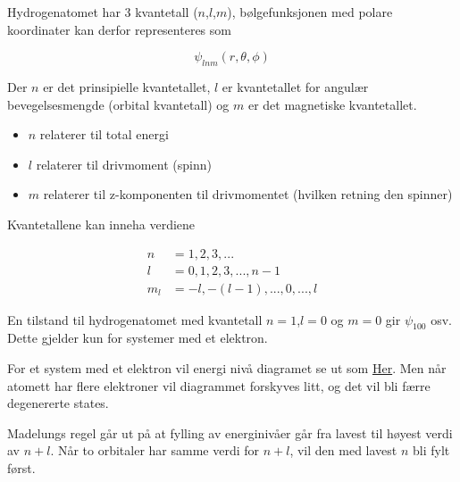 Hydrogenatomet har 3 kvantetall ($n$,$l$,$m$), bølgefunksjonen med polare koordinater kan derfor representeres som

\begin{equation}
    \psi_{lnm}(r,\theta,\phi)
\end{equation}

Der $n$ er det prinsipielle kvantetallet, $l$ er kvantetallet for angulær bevegelsesmengde (orbital kvantetall) og $m$ er det magnetiske kvantetallet.

\color{red}

\begin{itemize}
\centering
    \item $n$ relaterer til total energi
    \item $l$ relaterer til drivmoment (spinn)
    \item $m$ relaterer til z-komponenten til drivmomentet (hvilken retning den spinner)
\end{itemize}
\color{black}

\newpage
Kvantetallene kan inneha verdiene 

\begin{equation*}
    \begin{split}
        n &= 1, 2, 3, ...\\
        l &= 0, 1, 2, 3, ..., n-1\\
        m_l &= -l, -(l-1), ..., 0, ..., l
    \end{split}
\end{equation*}

En tilstand til hydrogenatomet med kvantetall $n=1$,$l=0$ og $m=0$ gir
$\psi_{100}$ osv. Dette gjelder kun for systemer med et elektron. 

For et system med et elektron vil energi nivå diagramet se ut som \href{https://www.google.com/search?q=energy+level+diagram+for+hydrogen&sca_esv=779b01740ca52ec5&sca_upv=1&rlz=1C5CHFA_enNO829NO829&udm=2&biw=1680&bih=904&sxsrf=ACQVn09akSWsMLxftMzmPMdTNcY0gxBSJA%3A1714049752819&ei=2FIqZpLKMbjPwPAP7-qYwAQ&oq=Energy+level+diagr&gs_lp=Egxnd3Mtd2l6LXNlcnAiEkVuZXJneSBsZXZlbCBkaWFncioCCAEyBRAAGIAEMgoQABiABBhDGIoFMgUQABiABDIKEAAYgAQYQxiKBTIFEAAYgAQyBRAAGIAEMgUQABiABDIFEAAYgAQyBRAAGIAEMgUQABiABEiVO1DKBVikKHAGeACQAQCYAfsBoAH7DaoBBjE2LjQuMbgBA8gBAPgBAZgCGKAC5A7CAgQQIxgnmAMAiAYBkgcGMTkuNC4xoAf_dw&sclient=gws-wiz-serp#vhid=NSb9L5eew_qdbM&vssid=mosaic}{Her}. Men når atomett har flere elektroner vil diagrammet forskyves litt, og det vil bli færre degenererte states. 

Madelungs regel går ut på at fylling av energinivåer går fra lavest til høyest verdi av $n+l$. Når to orbitaler har samme verdi for $n+l$, vil den med lavest $n$ bli fylt først. 

